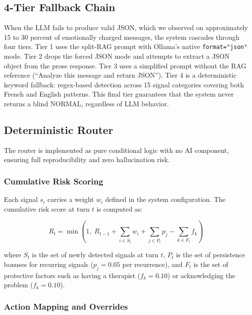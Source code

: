 \documentclass[11pt, a4paper, twocolumn]{article}
\begin{document}
\subsection{4-Tier Fallback Chain}

When the LLM fails to produce valid JSON, which we observed on approximately 15 to 30 percent of emotionally charged messages, the system cascades through four tiers. Tier 1 uses the split-RAG prompt with Ollama's native \texttt{format="json"} mode. Tier 2 drops the forced JSON mode and attempts to extract a JSON object from the prose response. Tier 3 uses a simplified prompt without the RAG reference (``Analyze this message and return JSON''). Tier 4 is a deterministic keyword fallback: regex-based detection across 15 signal categories covering both French and English patterns. This final tier guarantees that the system never returns a blind NORMAL, regardless of LLM behavior.

\subsection{Deterministic Router}
\label{subsec:router}

The router is implemented as pure conditional logic with no AI component, ensuring full reproducibility and zero hallucination risk.

\subsubsection{Cumulative Risk Scoring}

Each signal $s_i$ carries a weight $w_i$ defined in the system configuration. The cumulative risk score at turn $t$ is computed as:

\begin{equation}
R_t = \min\!\left(1, \; R_{t-1} + \sum_{i \in S_t} w_i + \sum_{j \in P_t} p_j - \sum_{k \in F_t} f_k\right)
\label{eq:risk}
\end{equation}

where $S_t$ is the set of newly detected signals at turn $t$, $P_t$ is the set of persistence bonuses for recurring signals ($p_j = 0.05$ per recurrence), and $F_t$ is the set of protective factors such as having a therapist ($f_k = 0.10$) or acknowledging the problem ($f_k = 0.10$).

\subsubsection{Action Mapping and Overrides}
\end{document}

